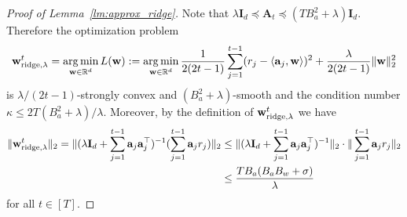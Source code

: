 \documentclass[10pt]{article}
\newcommand{\id}{\bI}
\DeclareMathOperator*{\argmin}{arg\,min}
\newcommand{\<}{\left\langle}
\renewcommand{\>}{\right\rangle}
\newcommand{\ridge}{{\rm ridge}}
\newcommand{\R}{\mathbb{R}}
\def\bA{{\mathbf A}}
\def\bI{{\mathbf I}}
\def\ba{{\mathbf a}}
\def\bw{{\mathbf w}}
\begin{document}
\begin{proof}[Proof of Lemma~\ref{lm:approx_ridge}]
Note that $\lambda\id_d\preceq \bA_t\preceq (TB_a^2+\lambda)\id_d$. Therefore the optimization problem
$$\bw^t_{\ridge,\lambda}=\argmin_{\bw\in\R^d}L(\bw):=\argmin_{\bw\in\R^d}\frac{1}{2(2t-1)}\sum_{j=1}^{t-1}(r_j-\<\ba_j,\bw\>)^2+\frac{\lambda}{2(2t-1)}\|\bw\|_2^2$$
is $\lambda/(2t-1)$-strongly convex  and $(B_a^2+\lambda)$-smooth and the condition number $\kappa\leq 2T(B_a^2+\lambda)/\lambda$. Moreover, by the definition of $\bw_{\ridge,\lambda}^t$ we have
\begin{align*}
    \|\bw^t_{\ridge,\lambda}\|_2=\|(\lambda\id_d+\sum_{j=1}^{t-1}\ba_j\ba_j^\top)^{-1}(\sum_{j=1}^{t-1}\ba_jr_j)\|_2&\leq
    \|(\lambda\id_d+\sum_{j=1}^{t-1}\ba_j\ba_j^\top)^{-1}\|_2\cdot\|\sum_{j=1}^{t-1}\ba_jr_j\|_2\\&\leq
    \frac{TB_a(B_aB_w+\sigma)}{\lambda}
\end{align*}
for all $t\in[T]$.

\end{proof}
\end{document}
